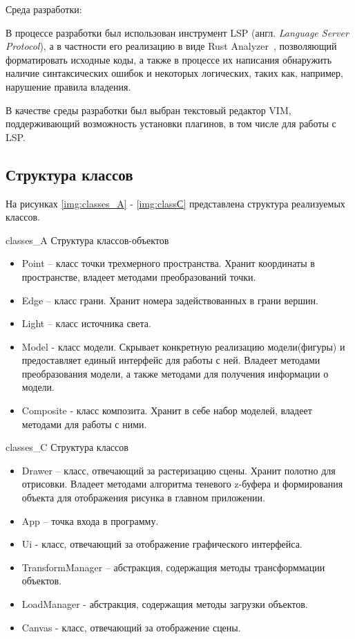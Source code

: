 Среда разработки:

В процессе разработки был использован инструмент LSP\cite{lsp} (англ. \textit{Language Server Protocol}), а в частности его реализацию в виде Rust Analyzer~\cite{rust-anal}, позволяющий форматировать исходные коды, а также в процессе их написания обнаружить наличие синтаксических ошибок и некоторых логических, таких как, например, нарушение правила владения\cite{rust-learn}.

В качестве среды разработки был выбран текстовый редактор VIM\cite{vim}, поддерживающий возможность установки плагинов\cite{vim-plugins}, в том числе для работы с LSP\cite{lsp}.
\subsection{Структура классов}

На рисунках \ref{img:classes_A} - \ref{img:classС} представлена структура реализуемых классов.

\img{100mm}
{classes_A} %
{Структура классов-объектов} %

\begin{itemize}
    \item Point – класс точки трехмерного пространства. Хранит координаты в пространстве, владеет методами преобразований точки.
    \item Edge – класс грани. Хранит номера задействованных в грани вершин.
    \item Light – класс источника света.
    \item Model - класс модели. Скрывает конкретную реализацию модели(фигуры) и предоставляет единый интерфейс для работы с ней. Владеет методами преобразования модели, а также методами для получения информации о модели.
    \item Composite - класс композита. Хранит в себе набор моделей, владеет методами для работы с ними.
\end{itemize}

\img{100mm}
{classes_C} %
{Структура классов} %

\begin{itemize}
    \item Drawer – класс, отвечающий за растеризацию сцены. Хранит полотно для отрисовки. Владеет методами алгоритма теневого z-буфера и формирования объекта для отображения рисунка в главном приложении.
    \item App – точка входа в программу.
    \item Ui - класс, отвечающий за отображение графического интерфейса.
    \item TransformManager – абстракция, содержащия методы трансформмации объектов.
    \item LoadManager - абстракция, содержащия методы загрузки объектов.
    \item Canvas - класс, отвечающий за отображение сцены.
\end{itemize}
